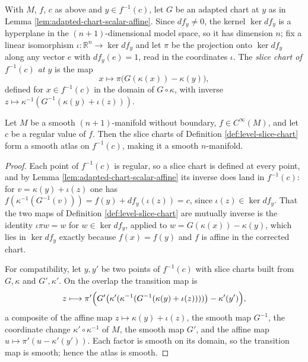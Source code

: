 \begin{definition}
\label{def:level-slice-chart}





With $M$, $f$, $c$ as above and $y \in f^{-1}(c)$, let $G$ be an adapted chart at $y$ as in Lemma \ref{lem:adapted-chart-scalar-affine}. Since $df_y \neq 0$, the kernel $\ker df_y$ is a hyperplane in the $(n+1)$-dimensional model space, so it has dimension $n$; fix a linear isomorphism $\iota : \mathbb{R}^n \to \ker df_y$ and let $\pi$ be the projection onto $\ker df_y$ along any vector $e$ with $df_y(e) = 1$, read in the coordinates $\iota$. The \emph{slice chart of $f^{-1}(c)$ at $y$} is the map
\[
  x \longmapsto \pi\bigl(G(\kappa(x)) - \kappa(y)\bigr),
\]
defined for $x \in f^{-1}(c)$ in the domain of $G \circ \kappa$, with inverse $z \mapsto \kappa^{-1}(G^{-1}(\kappa(y) + \iota(z)))$.
\end{definition}

\begin{proposition}
\label{prop:regular-level-set-hypersurface-codim-one}





Let $M$ be a smooth $(n+1)$-manifold without boundary, $f \in C^\infty(M)$, and let $c$ be a regular value of $f$. Then the slice charts of Definition \ref{def:level-slice-chart} form a smooth atlas on $f^{-1}(c)$, making it a smooth $n$-manifold.
\end{proposition}

\begin{proof}

Each point of $f^{-1}(c)$ is regular, so a slice chart is defined at every point, and by Lemma \ref{lem:adapted-chart-scalar-affine} its inverse does land in $f^{-1}(c)$: for $v = \kappa(y) + \iota(z)$ one has $f(\kappa^{-1}(G^{-1}(v))) = f(y) + df_y(\iota(z)) = c$, since $\iota(z) \in \ker df_y$. That the two maps of Definition \ref{def:level-slice-chart} are mutually inverse is the identity $\iota\pi w = w$ for $w \in \ker df_y$, applied to $w = G(\kappa(x)) - \kappa(y)$, which lies in $\ker df_y$ exactly because $f(x) = f(y)$ and $f$ is affine in the corrected chart.

For compatibility, let $y, y'$ be two points of $f^{-1}(c)$ with slice charts built from $G, \kappa$ and $G', \kappa'$. On the overlap the transition map is
\[
  z \longmapsto \pi'\Bigl( G'\bigl(\kappa'(\kappa^{-1}(G^{-1}(\kappa(y) + \iota(z))))\bigr) - \kappa'(y') \Bigr),
\]
a composite of the affine map $z \mapsto \kappa(y) + \iota(z)$, the smooth map $G^{-1}$, the coordinate change $\kappa' \circ \kappa^{-1}$ of $M$, the smooth map $G'$, and the affine map $u \mapsto \pi'(u - \kappa'(y'))$. Each factor is smooth on its domain, so the transition map is smooth; hence the atlas is smooth.
\end{proof}

